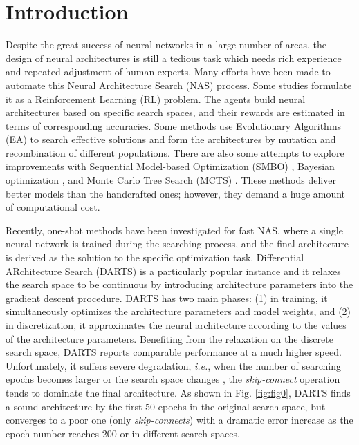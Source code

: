 \documentclass[journal]{IEEEtran}
\begin{document}
\section{Introduction}
\label{S.Intro}
Despite the great success of neural networks in a large number of areas, the design of neural architectures is still a tedious task which needs rich experience and repeated adjustment of human experts. Many efforts have been made to automate this Neural Architecture Search (NAS) process. Some studies \cite{DBLP:conf/iclr/BakerGNR17,DBLP:conf/iclr/ZophL17,DBLP:conf/cvpr/ZhongYWSL18,DBLP:conf/cvpr/ZophVSL18} formulate it as a Reinforcement Learning (RL) problem. The agents build neural architectures based on specific search spaces, and their rewards are estimated in terms of corresponding accuracies. Some methods \cite{DBLP:conf/icml/RealMSSSTLK17, DBLP:conf/iccv/XieY17, DBLP:conf/ijcai/SuganumaSN18, DBLP:conf/iclr/LiuSVFK18, DBLP:conf/iclr/ElskenMH18, DBLP:conf/pkdd/Wistuba18, DBLP:conf/aaai/RealAHL19} use Evolutionary Algorithms (EA) to search effective solutions and form the architectures by mutation and recombination of different populations. There are also some attempts to explore improvements with Sequential Model-based Optimization (SMBO) \cite{DBLP:conf/eccv/DongCJWS18,DBLP:conf/eccv/LiuZNSHLFYHM18}, Bayesian optimization \cite{DBLP:conf/nips/KandasamyNSPX18}, and Monte Carlo Tree Search (MCTS) \cite{DBLP:journals/corr/NegrinhoG17}. These methods deliver better models than the handcrafted ones; however, they demand a huge amount of computational cost.

Recently, one-shot methods \cite{DBLP:conf/iclr/BrockLRW18, DBLP:conf/iclr/XieZLL19, DBLP:conf/iclr/ShinPS18, DBLP:conf/eccv/AhmedT18} have been investigated for fast NAS, where a single neural network is trained during the searching process, and the final architecture is derived as the solution to the specific optimization task. Differential ARchitecture Search (DARTS) \cite{DBLP:conf/iclr/LiuSY19} is a particularly popular instance and it relaxes the search space to be continuous by introducing architecture parameters into the gradient descent procedure. DARTS has two main phases: (1) in training, it simultaneously optimizes the architecture parameters and  model weights, and (2) in discretization, it approximates the neural architecture according to the values of the architecture parameters. Benefiting from the relaxation on the discrete search space, DARTS reports comparable performance at a much higher speed. Unfortunately, it suffers severe degradation, \emph{i.e.}, when the number of searching epochs becomes larger or the search space changes \cite{DBLP:conf/iclr/ZelaESMBH20}, the \emph{skip-connect} operation tends to dominate the final architecture. As shown in Fig. \ref{fig:fig0}, DARTS finds a sound architecture by the first 50 epochs in the original search space, but converges to a poor one (only \emph{skip-connects}) with a dramatic error increase as the epoch number reaches 200 or in different search spaces.
\end{document}
